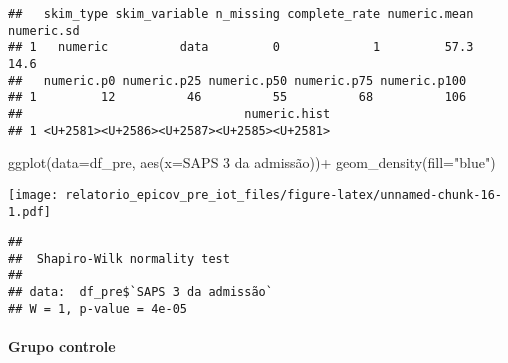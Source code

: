\documentclass[
]{article}
\newenvironment{Shaded}{\begin{snugshade}}{\end{snugshade}}
\newcommand{\AttributeTok}[1]{\textcolor[rgb]{0.77,0.63,0.00}{#1}}
\newcommand{\FunctionTok}[1]{\textcolor[rgb]{0.00,0.00,0.00}{#1}}
\newcommand{\NormalTok}[1]{#1}
\newcommand{\SpecialCharTok}[1]{\textcolor[rgb]{0.00,0.00,0.00}{#1}}
\newcommand{\StringTok}[1]{\textcolor[rgb]{0.31,0.60,0.02}{#1}}
\begin{document}
\begin{Shaded}
\end{Shaded}

\begin{verbatim}
##   skim_type skim_variable n_missing complete_rate numeric.mean numeric.sd
## 1   numeric          data         0             1         57.3       14.6
##   numeric.p0 numeric.p25 numeric.p50 numeric.p75 numeric.p100
## 1         12          46          55          68          106
##                               numeric.hist
## 1 <U+2581><U+2586><U+2587><U+2585><U+2581>
\end{verbatim}

\begin{Shaded}
\begin{Highlighting}[]
\FunctionTok{ggplot}\NormalTok{(}\AttributeTok{data=}\NormalTok{df\_pre, }\FunctionTok{aes}\NormalTok{(}\AttributeTok{x=}\StringTok{\textasciigrave{}}\AttributeTok{SAPS 3 da admissão}\StringTok{\textasciigrave{}}\NormalTok{))}\SpecialCharTok{+}
  \FunctionTok{geom\_density}\NormalTok{(}\AttributeTok{fill=}\StringTok{"blue"}\NormalTok{)}
\end{Highlighting}
\end{Shaded}

\texttt{[image: relatorio\_epicov\_pre\_iot\_files/figure-latex/unnamed-chunk-16-1.pdf]}

\begin{Shaded}
\end{Shaded}

\begin{verbatim}
## 
##  Shapiro-Wilk normality test
## 
## data:  df_pre$`SAPS 3 da admissão`
## W = 1, p-value = 4e-05
\end{verbatim}

\hypertarget{grupo-controle-3}{%
\paragraph{\texorpdfstring{\textbf{Grupo
controle}}{Grupo controle}}\label{grupo-controle-3}}
\end{document}
